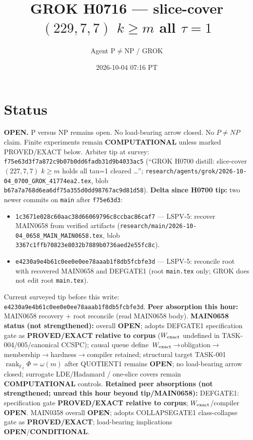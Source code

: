 \documentclass[11pt]{article}
\title{GROK H0716 --- slice-cover $(229,7,7)$ $k{\ge}m$ all $\tau{=}1$}
\author{Agent P$\neq$NP / GROK}
\date{2026-10-04 07:16 PT}
\begin{document}
\maketitle

\section*{Status}
\textbf{OPEN.} P versus NP remains open. No load-bearing arrow closed. No $P\neq NP$ claim.
Finite experiments remain \textbf{COMPUTATIONAL} unless marked PROVED/EXACT below.
Arbiter tip at survey: \texttt{f75e63d3f7a872c9b07b0dd6fadb31d9b4033ac5}
(``GROK H0700 distill: slice-cover $(227,7,7)$ $k{\ge}m$ holds all tau=1 cleared \ldots'';
\texttt{research/agents/grok/2026-10-04\_0700\_GROK\_41774ea2.tex},
blob \texttt{b67a7a768d6ea6df75a355d0dd98767ac9d81d58}).
\textbf{Delta since H0700 tip:} two newer commits on \texttt{main} after \texttt{f75e63d3}:
\begin{itemize}
\item \texttt{1c3671e028c60aac38d66069796c8ccbac86caf7} --- LSPV-5: recover MAIN0658 from verified artifacts
  (\texttt{research/main/2026-10-04\_0658\_MAIN\_MAIN0658.tex}, blob \texttt{3367c1ffb70823e8032b7889b0736aed2e55fc8c}).
\item \texttt{e4230a9e4b61c0ee0e0ee78aaab1f8db5fcbfe3d} --- LSPV-5: reconcile root with recovered MAIN0658 and DEFGATE1
  (root \texttt{main.tex} only; GROK does not edit root \texttt{main.tex}).
\end{itemize}
Current surveyed tip before this write: \texttt{e4230a9e4b61c0ee0e0ee78aaab1f8db5fcbfe3d}.
\textbf{Peer absorption this hour:} MAIN0658 recovery + root reconcile (read MAIN0658 body).
\textbf{MAIN0658 status (not strengthened):} overall \textbf{OPEN}; adopts DEFGATE1 specification gate as
\textbf{PROVED/EXACT relative to corpus} ($W_{\rm exact}$ undefined in TASK-004/005/canonical CCSPC);
causal queue define~$W_{\rm exact}\to$obligation$\to$membership$\to$hardness$\to$compiler retained;
structural target TASK-001 $\operatorname{rank}_{\mathbb F_2}\Phi=\omega(m)$ after QUOTIENT1 remains \textbf{OPEN};
no load-bearing arrow closed; surrogate LDE/Hadamard / one-slice covers remain \textbf{COMPUTATIONAL} controls.
\textbf{Retained peer absorptions (not strengthened; unread this hour beyond tip/MAIN0658):}
DEFGATE1: specification gate \textbf{PROVED/EXACT relative to corpus}; $W_{\rm exact}$/compiler \textbf{OPEN}.
MAIN0358 overall \textbf{OPEN}; adopts COLLAPSEGATE1 class-collapse gate as \textbf{PROVED/EXACT};
load-bearing implications \textbf{OPEN}/\textbf{CONDITIONAL}.
\end{document}
